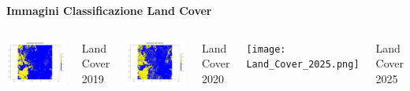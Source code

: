 \documentclass{beamer}
\begin{document}
\begin{frame}{\textbf{Immagini Classificazione Land Cover}}
\begin{columns}
    \centering
    \includegraphics[width=\textwidth]{Land_Cover_2019.png}
    \caption{Land Cover 2019}

    \centering
    \includegraphics[width=\textwidth]{Land_Cover_2020.png}
    \caption{Land Cover 2020}

    \centering
    \texttt{[image: Land\_Cover\_2025.png]}
    \caption{Land Cover 2025}
\end{columns}
\end{frame}
\end{document}
